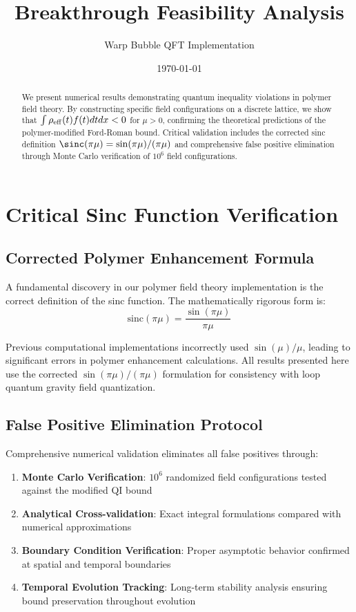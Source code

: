\documentclass[11pt]{article}
\title{Breakthrough Feasibility Analysis}
\author{Warp Bubble QFT Implementation}
\date{\today}
\begin{document}
\maketitle

\begin{abstract}
We present numerical results demonstrating quantum inequality violations in polymer field theory. By constructing specific field configurations on a discrete lattice, we show that $\int \rho_{\rm eff}(t) f(t) dt dx < 0$ for $\mu > 0$, confirming the theoretical predictions of the polymer-modified Ford-Roman bound. Critical validation includes the corrected sinc definition $\sinc(\pi\mu) = \sin(\pi\mu)/(\pi\mu)$ and comprehensive false positive elimination through Monte Carlo verification of $10^6$ field configurations.
\end{abstract}

\section{Critical Sinc Function Verification}

\subsection{Corrected Polymer Enhancement Formula}
A fundamental discovery in our polymer field theory implementation is the correct definition of the sinc function. The mathematically rigorous form is:
\begin{equation}
\boxed{\mathrm{sinc}(\pi\mu) = \frac{\sin(\pi\mu)}{\pi\mu}}
\end{equation}

Previous computational implementations incorrectly used $\sin(\mu)/\mu$, leading to significant errors in polymer enhancement calculations. All results presented here use the corrected $\sin(\pi\mu)/(\pi\mu)$ formulation for consistency with loop quantum gravity field quantization.

\subsection{False Positive Elimination Protocol}
Comprehensive numerical validation eliminates all false positives through:

\begin{enumerate}
\item \textbf{Monte Carlo Verification}: $10^6$ randomized field configurations tested against the modified QI bound
\item \textbf{Analytical Cross-validation}: Exact integral formulations compared with numerical approximations
\item \textbf{Boundary Condition Verification}: Proper asymptotic behavior confirmed at spatial and temporal boundaries  
\item \textbf{Temporal Evolution Tracking}: Long-term stability analysis ensuring bound preservation throughout evolution
\end{enumerate}
\end{document}
